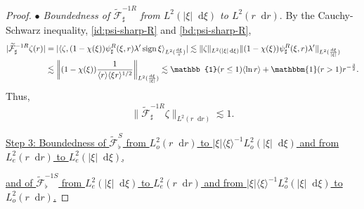 \documentclass[11 pt]{amsart}
\theoremstyle{definition}
\theoremstyle{remark}
\numberwithin{equation}{section}
\newcommand{\dd}{\mathop{}\!\mathrm{d}}
\begin{document}
\begin{proof}
\smallskip

\noindent \textit{$\bullet$ Boundedness of $\widetilde{\mathcal F}_\sharp^{-1R}$ from $L^2(|\xi|\dd \xi)$ to $L^2(r\dd r)$}. By the Cauchy-Schwarz inequality, \eqref{id:psi-sharp-R} and \eqref{bd:psi-sharp-R},
\begin{align}
\nonumber |\widetilde{\mathcal{F}}^{-1R}_\sharp \zeta(r)| & = |\langle \zeta , (1-\chi(\xi))\psi_\sharp^R(\xi,r) \lambda' \operatorname{sign} \xi  \rangle_{L^2(\frac{\dd \xi}{\pi})}|\lesssim \| \zeta\|_{L^2(|\xi|\dd \xi)}\|(1-\chi(\xi))\psi_\sharp^R(\xi,r) \lambda' \|_{L^2(\frac{\dd \xi}{|\xi|})} \\
\label{bd:intermediaire-mathcalF-1Rsharp} &\lesssim \left\|(1-\chi(\xi))\frac{1}{\langle r \rangle \langle \xi r \rangle^{1/2}} \right\|_{L^2(\frac{\dd \xi}{|\xi|})} \lesssim \mathbb{1}(r\leq 1)\langle \ln r\rangle+ \mathbbm{1}(r>1)r^{-\frac 32}.
\end{align}
Thus,
$$
\| \widetilde{\mathcal F}_\sharp^{-1R}\zeta \|_{L^2(r \dd r)} \lesssim 1 .
$$


\medskip

\noindent \underline{Step 3: Boundedness of $\widetilde{\mathcal F}^S_\flat$ from $L^2_{o}(r\dd r)$ to $|\xi| \langle \xi\rangle^{-1}L^2_{o}(|\xi|\dd \xi)$ and from $L^2_{e}(r\dd r)$ to $L^2_{e}(|\xi|\dd \xi)$,}

\noindent \underline{and of $\widetilde{\mathcal F}^{-1S}_\flat$ from $L^2_{e}(|\xi|\dd \xi)$ to $L^2_{e}(r\dd r)$ and from $|\xi| \langle \xi\rangle^{-1}L^2_{o}(|\xi|\dd \xi)$ to $L^2_{o}(r\dd r)$.}

\smallskip


\end{proof}
\end{document}
